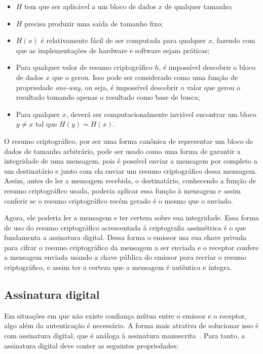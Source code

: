 \documentclass{article}
\begin{document}
\begin{itemize}
  \item $H$ tem que ser aplicável a um bloco de dados $x$ de qualquer tamanho;
  \item $H$ precisa produzir uma saída de tamanho fixo;
  \item $H(x)$ é relativamente fácil de ser computada para qualquer $x$,
      fazendo com que as implementações de hardware e software sejam práticas;
  \item Para qualquer valor de resumo criptográfico $h$, é impossível descobrir
      o bloco de dados $x$ que o gerou. Isso pode ser considerado como uma
        função de propriedade \textit{one-way}, ou seja, é impossível descobrir
        o valor que gerou o resultado tomando apenas o resultado como base de
        busca;
  \item Para qualquer $x$, deverá ser computacionalmente inviável encontrar um
      bloco $y \neq x$ tal que $H(y) = H(x)$.
\end{itemize}

O resumo criptográfico, por ser uma forma canônica de representar um bloco de
dados de tamanho arbitrário, pode ser usado como uma forma de garantir a
integridade de uma mensagem, pois é possível enviar a mensagem por completo a
um destinatário e junto com ela enviar um resumo criptográfico dessa mensagem.
Assim, antes de ler a mensagem recebida, o destinatário, conhecendo a função de
resumo criptográfico usada, poderia aplicar essa função à mensagem e assim
conferir se o resumo criptográfico recém gerado é o mesmo que o enviado.

Agora, ele poderia ler a mensagem e ter certeza sobre sua integridade. Essa
forma de uso do resumo criptográfico acrescentada à criptografia assimétrica é
o que fundamenta a assinatura digital. Dessa forma o emissor usa sua chave
privada para cifrar o resumo criptográfico da mensagem a ser enviada e o
receptor confere a mensagem enviada usando a chave pública do emissor para
recriar o resumo criptográfico, e assim ter a certeza que a mensagem é
autêntica e íntegra.

\subsection{Assinatura digital}\label{subsec:digitalsig}

Em situações em que não existe confiança mútua entre o emissor e o receptor,
algo além da autenticação é necessário. A forma mais atrativa de solucionar
isso é com assinatura digital, que é análoga à assinatura
manuscrita~\cite{Stallings:book:2016}. Para tanto, a assinatura digital deve
conter as seguintes propriedades:
\end{document}
